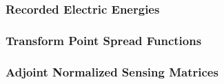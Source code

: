 \subsubsection{Recorded Electric Energies}


\subsubsection{Transform Point Spread Functions}


\subsubsection{Adjoint Normalized Sensing Matrices}


%

